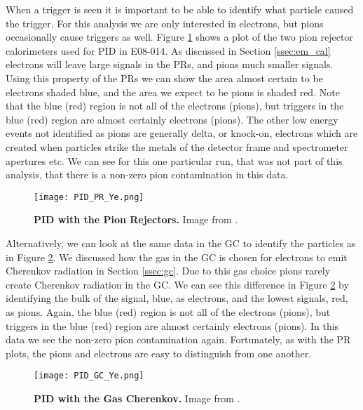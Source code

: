 When a trigger is seen it is important to be able to identify what particle caused the trigger. For this analysis we are only interested in electrons, but pions occasionally cause triggers as well. Figure \ref{fig:pid_pr_ye} shows a plot of the two pion rejector calorimeters used for PID in E08-014. As discussed in Section \ref{ssec:em_cal} electrons will leave large signals in the PRs, and pions much smaller signals. Using this property of the PRs we can show the area almost certain to be electrons shaded blue, and the area we expect to be pions is shaded red. Note that the blue (red) region is not all of the electrons (pions), but triggers in the blue (red) region are almost certainly electrons (pions). The other low energy events not identified as pions are generally delta, or knock-on, electrons which are created when particles strike the metals of the detector frame and spectrometer apertures etc. We can see for this one particular run, that was not part of this analysis, that there is a non-zero pion contamination in this data. 

\begin{figure}[!ht]
\begin{center}
\texttt{[image: PID\_PR\_Ye.png]}
\end{center}
\caption[PID with the Pion Rejectors]{
{\bf{PID with the Pion Rejectors.}} Image from \cite{Thesis:Ye}.}
\label{fig:pid_pr_ye}
\end{figure}

Alternatively, we can look at the same data in the GC to identify the particles as in Figure \ref{fig:pid_gc_ye}. We discussed how the gas in the GC is chosen for electrons to emit Cherenkov radiation in Section \ref{ssec:gc}. Due to this gas choice pions rarely create Cherenkov radiation in the GC. We can see this difference in Figure \ref{fig:pid_gc_ye} by identifying the bulk of the signal, blue, as electrons, and the lowest signals, red, as pions. Again, the blue (red) region is not all of the electrons (pions), but triggers in the blue (red) region are almost certainly electrons (pions). In this data we see the non-zero pion contamination again. Fortunately, as with the PR plots, the pions and electrons are easy to distinguish from one another.

\begin{figure}[!ht]
\begin{center}
\texttt{[image: PID\_GC\_Ye.png]}
\end{center}
\caption[PID with the Gas Cherenkov]{
{\bf{PID with the Gas Cherenkov.}} Image from \cite{Thesis:Ye}.}
\label{fig:pid_gc_ye}
\end{figure}

